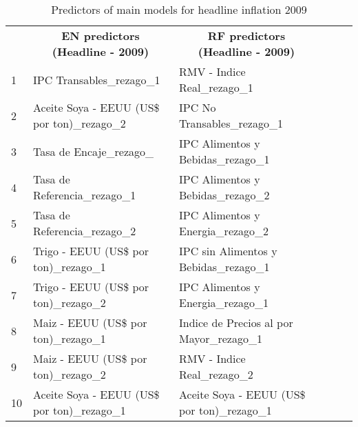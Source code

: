 \begin{table}[H]
\begin{tabular}{llllll}
   & \multicolumn{1}{c}{\textbf{EN predictors (Headline - 2009)}}                                                & \multicolumn{1}{c}{\textbf{RF predictors (Headline - 2009)}}                                            &  &  &  \\
1  & IPC Transables\_rezago\_1                          & RMV - Indice Real\_rezago\_1                 &  &  &  \\
2  & Aceite Soya - EEUU (US\$ por ton)\_rezago\_2     & IPC No Transables\_rezago\_1                   &  &  &  \\
3  & Tasa de Encaje\_rezago\_ & IPC Alimentos y Bebidas\_rezago\_1             &  &  &  \\
4  & Tasa de Referencia\_rezago\_1 & IPC Alimentos y Bebidas\_rezago\_2             &  &  &  \\
5  & Tasa de Referencia\_rezago\_2 & IPC Alimentos y Energia\_rezago\_2             &  &  &  \\
6  & Trigo - EEUU (US\$ por ton)\_rezago\_1           & IPC sin Alimentos y Bebidas\_rezago\_1         &  &  &  \\
7  & Trigo - EEUU (US\$ por ton)\_rezago\_2           & IPC Alimentos y Energia\_rezago\_1             &  &  &  \\
8  & Maiz - EEUU (US\$ por ton)\_rezago\_1            & Indice de Precios al por Mayor\_rezago\_1      &  &  &  \\
9  & Maiz - EEUU (US\$ por ton)\_rezago\_2            & RMV - Indice Real\_rezago\_2                 &  &  &  \\
10 & Aceite Soya - EEUU (US\$ por ton)\_rezago\_1     & Aceite Soya - EEUU (US\$ por ton)\_rezago\_1 &  &  & 
\end{tabular}
\caption{Predictors of main models for headline inflation 2009}
\end{table}
